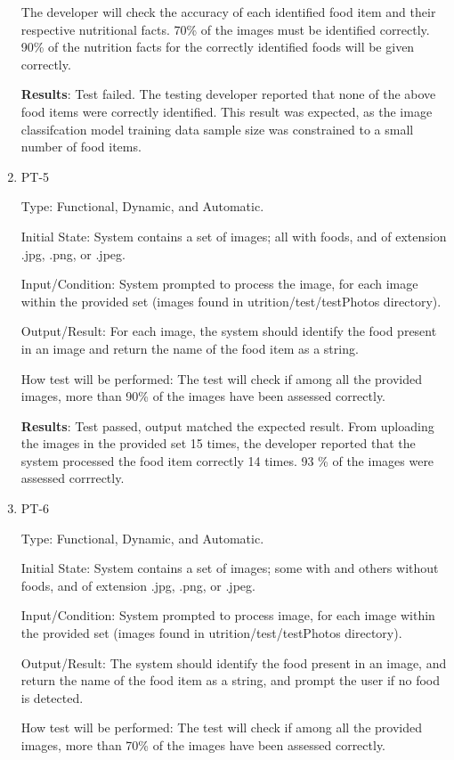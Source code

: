 \documentclass[12pt, titlepage]{article}
\begin{document}
\begin{enumerate}
		The developer will check the accuracy of each identified food item and 
		their respective nutritional facts. 70\% of the images must be identified correctly. 90\% of the nutrition facts for the correctly identified foods will be given correctly.
		
		\textbf{Results}: Test failed. The testing developer reported that none of the above food items were correctly identified. This result was expected, as the image classifcation model training data sample size was constrained to a small number of food items.
		
		\item{PT-5}
		
		Type: Functional, Dynamic, and Automatic.
		
		Initial State: System contains a set of images; all with foods, and of 
		extension .jpg, .png, or .jpeg.
		
		Input/Condition: System prompted to process the image, for each image 
		within the provided set (images found in utrition/test/testPhotos directory).
		
		Output/Result: For each image, the system should identify the food 
		present in an image and return the name of the food item as a string.
		
		How test will be performed: The test will check if among all the 
		provided images, more than 90\% of the images have been assessed 
		correctly.
		
		\textbf{Results}: Test passed, output matched the expected result. From uploading the images in the provided set 15 times, the developer reported that the system processed the food item correctly 14 times. 93 \% of the images were assessed corrrectly.
		
		\item{PT-6}
		
		Type: Functional, Dynamic, and Automatic.
		
		Initial State: System contains a set of images; some with and others 
		without foods, and of extension .jpg, .png, or 
		.jpeg.
		
		Input/Condition: System prompted to process image, for each image 
		within the provided set (images found in utrition/test/testPhotos directory).
		
		Output/Result: The system should identify the food present in an image, 
		and return the name of the food item as a string, and prompt the user 
		if no food is detected.
		
		How test will be performed: The test will check if among all the 
		provided images, more than 70\% of the images have been assessed 
		correctly.
		

\end{enumerate}
\end{document}
